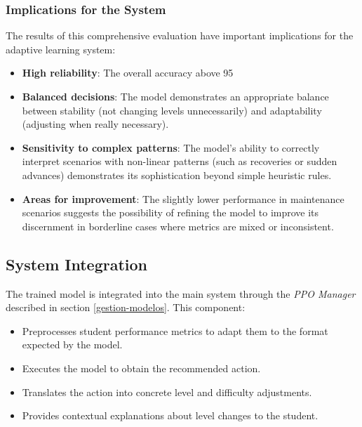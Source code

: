 \subsubsection{Implications for the System}

The results of this comprehensive evaluation have important implications for the adaptive learning system:

\begin{itemize}
    \item \textbf{High reliability}: The overall accuracy above 95%
    
    \item \textbf{Balanced decisions}: The model demonstrates an appropriate balance between stability (not changing levels unnecessarily) and adaptability (adjusting when really necessary).
    
    \item \textbf{Sensitivity to complex patterns}: The model's ability to correctly interpret scenarios with non-linear patterns (such as recoveries or sudden advances) demonstrates its sophistication beyond simple heuristic rules.
    
    \item \textbf{Areas for improvement}: The slightly lower performance in maintenance scenarios suggests the possibility of refining the model to improve its discernment in borderline cases where metrics are mixed or inconsistent.
\end{itemize}

\subsection{System Integration}
\label{integracion-sistema-ppo}

The trained model is integrated into the main system through the \textit{PPO Manager} described in section \ref{gestion-modelos}. This component:

\begin{itemize}
    \item Preprocesses student performance metrics to adapt them to the format expected by the model.
    \item Executes the model to obtain the recommended action.
    \item Translates the action into concrete level and difficulty adjustments.
    \item Provides contextual explanations about level changes to the student.
\end{itemize}

